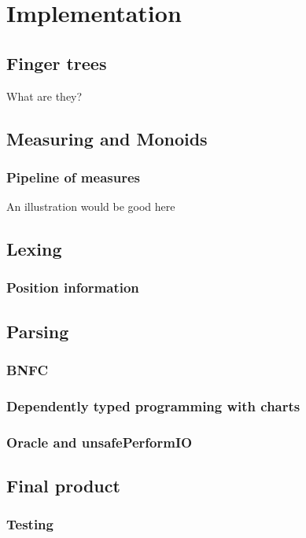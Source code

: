 \documentclass[a4paper,12pt,twosided]{report}
\begin{document}
%
%

\chapter{Implementation}

\section{Finger trees}
What are they?
\section{Measuring and Monoids}

\subsection{Pipeline of measures}
An illustration would be good here

\section{Lexing}
\subsection{Position information}

\section{Parsing}
\subsection{BNFC}
\subsection{Dependently typed programming with charts}
\subsection{Oracle and unsafePerformIO}

\section{Final product}
\subsection{Testing}
\end{document}
